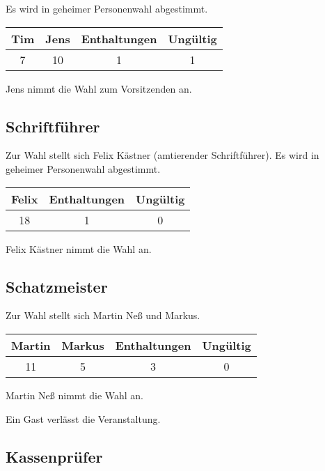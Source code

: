 \documentclass{scrartcl}
\begin{document}
Es wird in geheimer Personenwahl abgestimmt.

\begin{table}[h!]
    \centering
    \begin{tabular}{c|c|c|c}
        \textbf{Tim} & \textbf{Jens} & \textbf{Enthaltungen} &
\textbf{Ungültig} \\ \hline
        7 & 10 & 1 & 1 \\
    \end{tabular}
\end{table}

Jens nimmt die Wahl zum Vorsitzenden an.

\subsection{Schriftführer}
Zur Wahl stellt sich Felix Kästner (amtierender Schriftführer).
Es wird in geheimer Personenwahl abgestimmt.

\begin{table}[h!]
    \centering
    \begin{tabular}{c|c|c}
        \textbf{Felix} & \textbf{Enthaltungen} &
\textbf{Ungültig} \\ \hline
        18 & 1 & 0 \\
    \end{tabular}
\end{table}

Felix Kästner nimmt die Wahl an.

\subsection{Schatzmeister}

Zur Wahl stellt sich Martin Neß und Markus. %

\begin{table}[h!]
    \centering
    \begin{tabular}{c|c|c|c}
        \textbf{Martin} & \textbf{Markus} & \textbf{Enthaltungen} &
\textbf{Ungültig} \\ \hline
        11 & 5 & 3 & 0 \\
    \end{tabular}
\end{table}

Martin Neß nimmt die Wahl an.

Ein Gast verlässt die Veranstaltung.

\subsection{Kassenprüfer}
\end{document}
